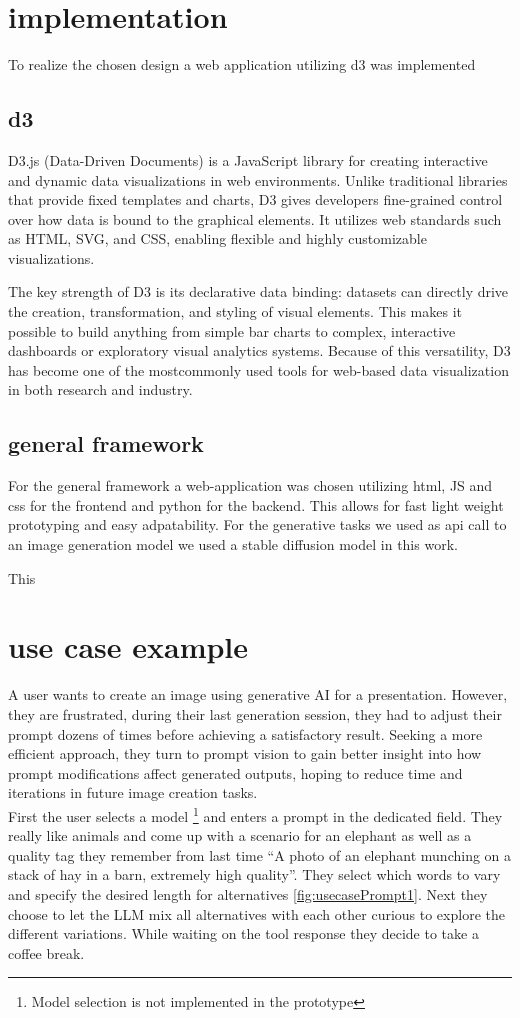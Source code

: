 \documentclass[
  a4paper,  %
  twoside,  %
  bibliography=totoc,
  headsepline,
  cleardoublepage=empty,
  parskip=half,
  draft=false
]{scrbook}
\begin{document}
\chapter{implementation}
To realize the chosen design a web application utilizing d3 was implemented
\section{d3}
D3.js (Data-Driven Documents) is a JavaScript library for creating interactive and dynamic data visualizations in web environments. Unlike traditional libraries that provide fixed templates and charts, D3 gives developers fine-grained control over how data is bound to the graphical elements. It utilizes web standards such as HTML, SVG, and CSS, enabling flexible and highly customizable visualizations.

The key strength of D3 is its declarative data binding: datasets can directly drive the creation, transformation, and styling of visual elements. This makes it possible to build anything from simple bar charts to complex, interactive dashboards or exploratory visual analytics systems. Because of this versatility, D3 has become one of the mostcommonly used tools for web-based data visualization in both research and industry.

\section{general framework}
For the general framework a web-application was chosen utilizing html, JS and css for the frontend and python for the backend.
This allows for fast light weight prototyping and easy adpatability. For the generative tasks we used as api call to an image generation model we used a stable diffusion model \cite{stableDiffusion} in this work.
                                                                        
This 
\chapter{use case example}
A user wants to create an image using generative AI for a presentation. However, they are frustrated, during their last generation session, they had to adjust their prompt dozens of times before achieving a satisfactory result. Seeking a more efficient approach, they turn to prompt vision to gain better insight into how prompt modifications affect generated outputs, hoping to reduce time and iterations in future image creation tasks.\\
First the user selects a model \footnote{Model selection is not implemented in the prototype} and enters a prompt in the dedicated field. They really like animals and come up with a scenario for an elephant as well as a quality tag they remember from last time \enquote{A photo of an elephant munching on a stack of hay in a barn, extremely high quality}. They select which words to vary and specify the desired length for alternatives \cref{fig:usecasePrompt1}. Next they choose to let the LLM mix all alternatives with each other curious to explore the different variations. While waiting on the tool response they decide to take a coffee break. 
\end{document}
